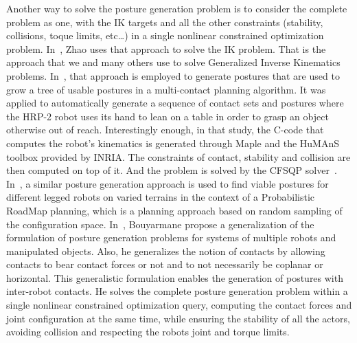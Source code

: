 Another way to solve the posture generation problem is to consider the complete problem as one, with the IK targets and all the other constraints (stability, collisions, toque limits, etc\ldots) in a single nonlinear constrained optimization problem.
In~\cite{Zhao1994}, Zhao uses that approach to solve the IK problem.
That is the approach that we and many others use to solve Generalized Inverse Kinematics problems.
In~\cite{escande:iros:2006}, that approach is employed to generate postures that are used to grow a tree of usable postures in a multi-contact planning algorithm.
It was applied to automatically generate a sequence of contact sets and postures where the HRP-2 robot uses its hand to lean on a table in order to grasp an object otherwise out of reach.
Interestingly enough, in that study, the C-code that computes the robot's kinematics is generated through Maple and the HuMAnS toolbox provided by INRIA.
The constraints of contact, stability and collision are then computed on top of it.
And the problem is solved by the CFSQP solver~\cite{cfsqp:manual}.
In~\cite{hauser:ijrr:2008}, a similar posture generation approach is used to find viable postures for different legged robots on varied terrains in the context of a Probabilistic RoadMap planning, which is a planning approach based on random sampling of the configuration space.
In~\cite{bouyarmane2010static}, Bouyarmane propose a generalization of the formulation of posture generation problems for systems of multiple robots and manipulated objects.
Also, he generalizes the notion of contacts by allowing contacts to bear contact forces or not and to not necessarily be coplanar or horizontal.
This generalistic formulation enables the generation of postures with inter-robot contacts.
He solves the complete posture generation problem within a single nonlinear constrained optimization query, computing the contact forces and joint configuration at the same time, while ensuring the stability of all the actors, avoiding collision and respecting the robots joint and torque limits.

